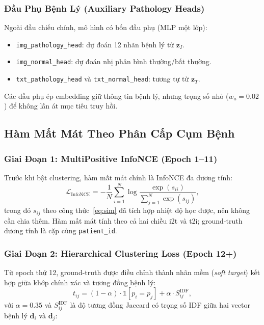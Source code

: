 \documentclass[12pt, a4paper]{article}
\newcommand{\calL}{\mathcal{L}}
\newcommand{\vect}[1]{\mathbf{#1}}
\begin{document}
\subsubsection{Đầu Phụ Bệnh Lý (Auxiliary Pathology Heads)}

Ngoài đầu chiếu chính, mô hình có bốn đầu phụ (MLP một lớp):
\begin{itemize}
  \item \texttt{img\_pathology\_head}: dự đoán 12 nhãn bệnh lý từ $\vect{z}_I$.
  \item \texttt{img\_normal\_head}: dự đoán nhị phân bình thường/bất thường.
  \item \texttt{txt\_pathology\_head} và \texttt{txt\_normal\_head}: tương tự từ $\vect{z}_T$.
\end{itemize}
Các đầu phụ ép embedding giữ thông tin bệnh lý, nhưng trọng số nhỏ
($w_a = 0.02$) để không lấn át mục tiêu truy hồi.

\subsection{Hàm Mất Mát Theo Phân Cấp Cụm Bệnh}
\label{sec:loss}

\subsubsection{Giai Đoạn 1: MultiPositive InfoNCE (Epoch 1--11)}

Trước khi bật clustering, hàm mất mát chính là InfoNCE đa dương tính:
\begin{equation}
  \calL_\text{InfoNCE} = -\frac{1}{N}\sum_{i=1}^{N}
    \log \frac{\exp(s_{ii})}
              {\sum_{j=1}^{N} \exp(s_{ij})},
  \label{eq:infonce}
\end{equation}
trong đó $s_{ij}$ theo công thức~\eqref{eq:sim} đã tích hợp nhiệt độ học được,
nên không cần chia thêm. Hàm mất mát tính theo cả hai chiều i2t và t2i;
ground-truth dương tính là cặp cùng \texttt{patient\_id}.

\subsubsection{Giai Đoạn 2: Hierarchical Clustering Loss (Epoch 12+)}
\label{sec:cluster_loss}

Từ epoch thứ 12, ground-truth được điều chỉnh thành nhãn mềm
(\textit{soft target}) kết hợp giữa khớp chính xác và tương đồng bệnh lý:
\begin{equation}
  t_{ij} = (1 - \alpha) \cdot \mathbb{1}[p_i = p_j]
           + \alpha \cdot S^\text{IDF}_{ij},
  \label{eq:soft_target}
\end{equation}
với $\alpha = 0.35$ và $S^\text{IDF}_{ij}$ là độ tương đồng Jaccard có trọng
số IDF giữa hai vector bệnh lý $\vect{d}_i$ và $\vect{d}_j$:
\end{document}

